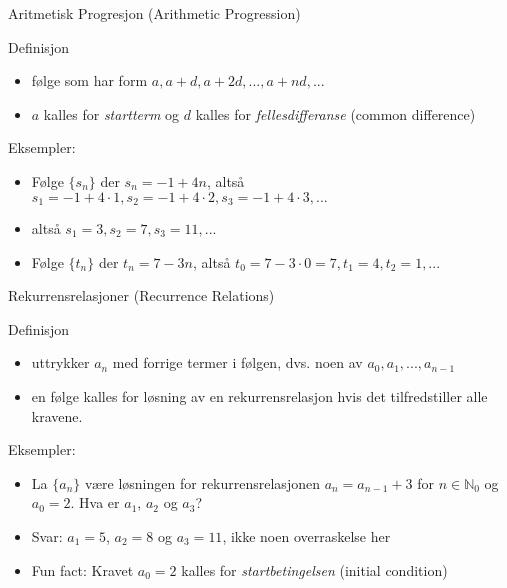 \begin{frame}{Aritmetisk Progresjon (Arithmetic Progression)}
    \pause
    \begin{block}{Definisjon}
        \begin{itemize}
            \item følge som har form $a, a + d, a + 2d, ..., a + nd, ...$
            \item $a$ kalles for \textit{startterm} og $d$ kalles for \textit{fellesdifferanse} (common difference)
        \end{itemize}
    \end{block}
    \pause
    Eksempler:\\
    \begin{itemize}
        \item Følge $\{s_n\}$ der $s_n = -1 + 4n$, altså $s_1 = -1 + 4 \cdot 1, s_2 = -1 + 4 \cdot 2, s_3 = -1 + 4 \cdot 3, ...$
        \pause
        \item altså $s_1 = 3, s_2 = 7, s_3 = 11, ...$
        \pause
        \item Følge $\{t_n\}$ der $t_n = 7 - 3n$, altså $t_0 = 7 - 3 \cdot 0 = 7, t_1 = 4, t_2 = 1, ...$
    \end{itemize}
\end{frame}

\begin{frame}{Rekurrensrelasjoner (Recurrence Relations)}
    \begin{block}{Definisjon}
        \begin{itemize}
            \item uttrykker $a_n$ med forrige termer i følgen, dvs. noen av $a_0, a_1, ..., a_{n-1}$
            \item en følge kalles for løsning av en rekurrensrelasjon hvis det tilfredstiller alle kravene.
        \end{itemize}
    \end{block}
    \pause
    Eksempler:\\
    \begin{itemize}
        \item La $\{a_n\}$ være løsningen for rekurrensrelasjonen $a_n = a_{n-1} + 3$ for $n \in \mathbb{N}_0$ og $a_0 = 2$. Hva er $a_1$, $a_2$ og $a_3$?
        \pause
        \item Svar: $a_1 = 5$, $a_2 = 8$ og $a_3 = 11$, ikke noen overraskelse her
        \item Fun fact: Kravet $a_0 = 2$ kalles for \textit{startbetingelsen} (initial condition)
    \end{itemize}
\end{frame}

